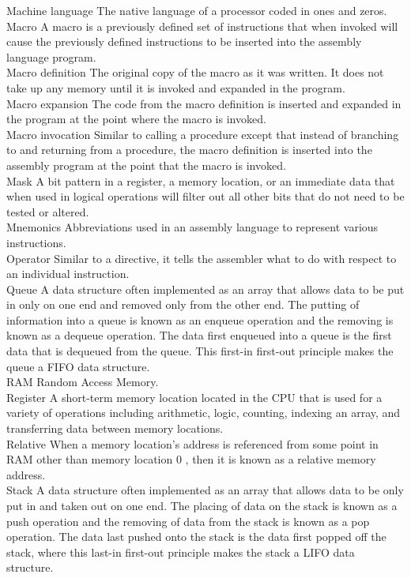 \documentclass[10pt]{article}
\begin{document}
Machine language The native language of a processor coded in ones and zeros. Macro A macro is a previously defined set of instructions that when invoked will cause the previously defined instructions to be inserted into the assembly language program.\\
Macro definition The original copy of the macro as it was written. It does not take up any memory until it is invoked and expanded in the program.\\
Macro expansion The code from the macro definition is inserted and expanded in the program at the point where the macro is invoked.\\
Macro invocation Similar to calling a procedure except that instead of branching to and returning from a procedure, the macro definition is inserted into the assembly program at the point that the macro is invoked.\\
Mask A bit pattern in a register, a memory location, or an immediate data that when used in logical operations will filter out all other bits that do not need to be tested or altered.\\
Mnemonics Abbreviations used in an assembly language to represent various instructions.\\
Operator Similar to a directive, it tells the assembler what to do with respect to an individual instruction.\\
Queue A data structure often implemented as an array that allows data to be put in only on one end and removed only from the other end. The putting of information into a queue is known as an enqueue operation and the removing is known as a dequeue operation. The data first enqueued into a queue is the first data that is dequeued from the queue. This first-in first-out principle makes the queue a FIFO data structure.\\
RAM Random Access Memory.\\
Register A short-term memory location located in the CPU that is used for a variety of operations including arithmetic, logic, counting, indexing an array, and transferring data between memory locations.\\
Relative When a memory location's address is referenced from some point in RAM other than memory location 0 , then it is known as a relative memory address.\\
Stack A data structure often implemented as an array that allows data to be only put in and taken out on one end. The placing of data on the stack is known as a push operation and the removing of data from the stack is known as a pop operation. The data last pushed onto the stack is the data first popped off the stack, where this last-in first-out principle makes the stack a LIFO data structure.
\end{document}
